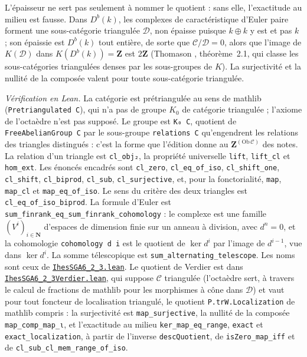 \noindent L'épaisseur ne sert pas seulement à nommer le quotient : sans elle, l'exactitude au milieu est fausse. Dans $D^b(k)$, les complexes de caractéristique d'Euler paire forment une sous-catégorie triangulée $\mathcal D$, non épaisse puisque $k \oplus k$ y est et pas $k$ ; son épaissie est $D^b(k)$ tout entière, de sorte que $\mathcal C/\mathcal D = 0$, alors que l'image de $K(\mathcal D)$ dans $K(D^b(k)) = \mathbf Z$ est $2\mathbf Z$ (Thomason \cite{thomason1997}, théorème~2.1, qui classe les sous-catégories triangulées denses par les sous-groupes de $K$). La surjectivité et la nullité de la composée valent pour toute sous-catégorie triangulée.

\noindent\emph{Vérification en Lean.} La catégorie est prétriangulée au sens de mathlib (\texttt{Pretriangulated C}), qui n'a pas de groupe $K_0$ de catégorie triangulée ; l'axiome de l'octaèdre n'est pas supposé. Le groupe est \texttt{K₀ C}, quotient de \texttt{FreeAbelianGroup C} par le sous-groupe \texttt{relations C} qu'engendrent les relations des triangles distingués : c'est la forme que l'édition donne au $\mathbf Z^{(\mathrm{Ob}\,\mathcal C)}$ des notes. La relation d'un triangle est \texttt{cl\_obj₂}, la propriété universelle \texttt{lift}, \texttt{lift\_cl} et \texttt{hom\_ext}. Les énoncés encadrés sont \texttt{cl\_zero}, \texttt{cl\_eq\_of\_iso}, \texttt{cl\_shift\_one}, \texttt{cl\_shift}, \texttt{cl\_biprod}, \texttt{cl\_sub}, \texttt{cl\_surjective}, et, pour la fonctorialité, \texttt{map}, \texttt{map\_cl} et \texttt{map\_eq\_of\_iso}. Le sens  du critère des deux triangles est \texttt{cl\_eq\_of\_iso\_biprod}. La formule d'Euler est \texttt{sum\_finrank\_eq\_sum\_finrank\_cohomology} : le complexe est une famille $(V^i)_{i \in \mathbf N}$ d'espaces de dimension finie sur un anneau à division, avec $d^n = 0$, et la cohomologie \texttt{cohomology d i} est le quotient de $\ker d^i$ par l'image de $d^{i-1}$, vue dans $\ker d^i$. La somme télescopique est \texttt{sum\_alternating\_telescope}. Les noms sont ceux de \href{\leanblobmain/CategoryTheory/IhesSGA6_2_3.lean}{\texttt{IhesSGA6\_2\_3.\allowbreak{}lean}}. Le quotient de Verdier est dans \href{\leanblobmain/CategoryTheory/IhesSGA6_2_3Verdier.lean}{\texttt{IhesSGA6\_2\_3Verdier.\allowbreak{}lean}}, qui suppose $\mathcal C$ triangulée (l'octaèdre sert, à travers le calcul de fractions de mathlib pour les morphismes à cône dans $\mathcal D$) et vaut pour tout foncteur de localisation triangulé, le quotient \texttt{P.trW.Localization} de mathlib compris : la surjectivité est \texttt{map\_surjective}, la nullité de la composée \texttt{map\_comp\_map\_ι}, et l'exactitude au milieu \texttt{ker\_map\_eq\_range}, \texttt{exact} et \texttt{exact\_localization}, à partir de l'inverse \texttt{descQuotient}, de \texttt{isZero\_map\_iff} et de \texttt{cl\_sub\_cl\_mem\_range\_of\_iso}.

